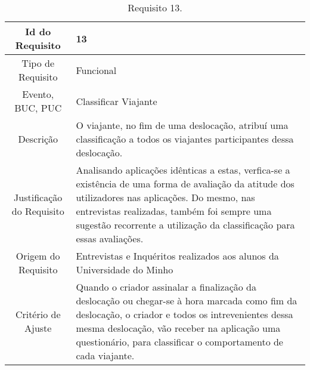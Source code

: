 \begin{table}[H]
\begin{center}
  \begin{tabularx}{\textwidth}{ | c | X | }
    \hline
    Id do Requisito & 13  \\
    
    \hline
    Tipo de Requisito & Funcional \\
    
    \hline
    Evento, BUC, PUC &  Classificar Viajante\\
    
    \hline
    Descrição & O viajante, no fim de uma deslocação, atribuí uma classificação a todos os viajantes participantes dessa deslocação. \\
    
    \hline
    Justificação do Requisito & Analisando aplicações idênticas a estas, verfica-se a existência de uma forma de avaliação da atitude dos utilizadores nas aplicações. Do mesmo, nas entrevistas realizadas, também foi sempre uma sugestão recorrente a utilização da classificação para essas avaliações.  \\
    
    \hline
    Origem do Requisito & Entrevistas e Inquéritos realizados aos alunos da Universidade do Minho \\
    
    \hline
    Critério de Ajuste & Quando o criador assinalar a finalização da deslocação ou chegar-se à hora marcada como fim da deslocação, o criador e todos os intrevenientes dessa mesma deslocação, vão receber na aplicação uma questionário, para classificar o comportamento de cada viajante.  \\
    
    \hline
  \end{tabularx}
  \caption{Requisito 13.} \label{tab:r3}
\end{center}
\end{table}

